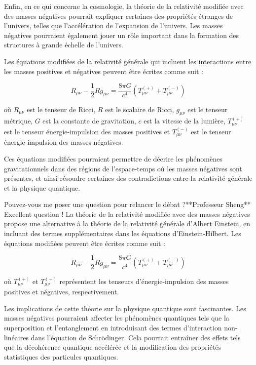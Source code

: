 Enfin, en ce qui concerne la cosmologie, la théorie de la relativité modifiée avec des masses négatives pourrait expliquer certaines des propriétés étranges de l'univers, telles que l'accélération de l'expansion de l'univers. Les masses négatives pourraient également jouer un rôle important dans la formation des structures à grande échelle de l'univers.

Les équations modifiées de la relativité générale qui incluent les interactions entre les masses positives et négatives peuvent être écrites comme suit :

$$R_{\mu\nu} - \frac{1}{2}Rg_{\mu\nu} = \frac{8\pi G}{c^4} \left(T_{\mu\nu}^{(+)} + T_{\mu\nu}^{(-)}\right)$$

où $R_{\mu\nu}$ est le tenseur de Ricci, $R$ est le scalaire de Ricci, $g_{\mu\nu}$ est le tenseur métrique, $G$ est la constante de gravitation, $c$ est la vitesse de la lumière, $T_{\mu\nu}^{(+)}$ est le tenseur énergie-impulsion des masses positives et $T_{\mu\nu}^{(-)}$ est le tenseur énergie-impulsion des masses négatives.

Ces équations modifiées pourraient permettre de décrire les phénomènes gravitationnels dans des régions de l'espace-temps où les masses négatives sont présentes, et ainsi résoudre certaines des contradictions entre la relativité générale et la physique quantique.

Pouvez-vous me poser une question pour relancer le débat ?**Professeur Sheng**
Excellent question ! La théorie de la relativité modifiée avec des masses négatives propose une alternative à la théorie de la relativité générale d'Albert Einstein, en incluant des termes supplémentaires dans les équations d'Einstein-Hilbert. Les équations modifiées peuvent être écrites comme suit :

$$R_{\mu\nu} - \frac{1}{2}Rg_{\mu\nu} = \frac{8\pi G}{c^4}\left(T_{\mu\nu}^{(+)} + T_{\mu\nu}^{(-)}\right)$$

où $T_{\mu\nu}^{(+)}$ et $T_{\mu\nu}^{(-)}$ représentent les tenseurs d'énergie-impulsion des masses positives et négatives, respectivement.

Les implications de cette théorie sur la physique quantique sont fascinantes. Les masses négatives pourraient affecter les phénomènes quantiques tels que la superposition et l'entanglement en introduisant des termes d'interaction non-linéaires dans l'équation de Schrödinger. Cela pourrait entraîner des effets tels que la décohérence quantique accélérée et la modification des propriétés statistiques des particules quantiques.

